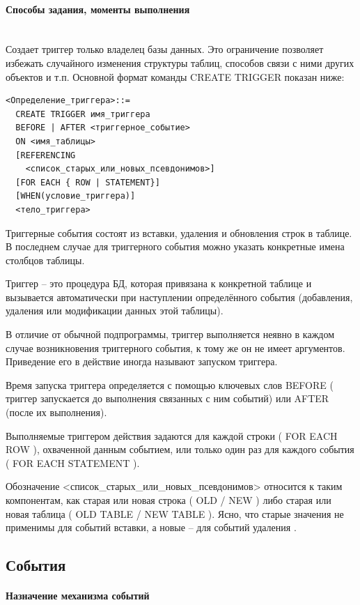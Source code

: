 \paragraph{Способы задания, моменты выполнения} ~\\

Создает триггер только владелец базы данных. Это ограничение позволяет избежать случайного изменения структуры таблиц, способов связи с ними других объектов и т.п.
Основной формат команды CREATE TRIGGER показан ниже:
\begin{verbatim}
<Определение_триггера>::=
  CREATE TRIGGER имя_триггера
  BEFORE | AFTER <триггерное_событие>
  ON <имя_таблицы>
  [REFERENCING 
    <список_старых_или_новых_псевдонимов>]
  [FOR EACH { ROW | STATEMENT}]
  [WHEN(условие_триггера)]
  <тело_триггера>
\end{verbatim}

Триггерные события состоят из вставки, удаления и обновления строк в таблице. В последнем случае для триггерного события можно указать конкретные имена столбцов таблицы.

Триггер – это процедура БД, которая привязана к конкретной таблице и вызывается
автоматически при наступлении определённого события
(добавления, удаления или модификации данных этой таблицы).

В отличие от обычной подпрограммы, триггер выполняется неявно в каждом случае возникновения триггерного события, к тому же он не имеет аргументов. Приведение его в действие иногда называют запуском триггера.

Время запуска триггера определяется с помощью ключевых слов BEFORE ( триггер запускается до выполнения связанных с ним событий) или AFTER (после их выполнения).

Выполняемые триггером действия задаются для каждой строки ( FOR EACH ROW ), охваченной данным событием, или только один раз для каждого события ( FOR EACH STATEMENT ).

Обозначение <список\_старых\_или\_новых\_псевдонимов> относится к таким компонентам, как старая или новая строка ( OLD / NEW ) либо старая или новая таблица ( OLD TABLE / NEW TABLE ). Ясно, что старые значения не применимы для событий вставки, а новые – для событий удаления \autocite{IntuitTrigg}.

\subsection{События}

\paragraph{Назначение механизма событий} ~\\


